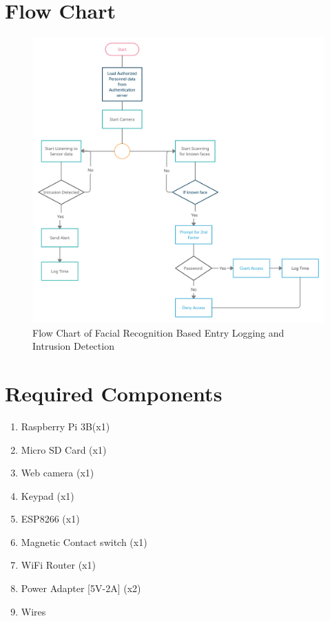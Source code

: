 \section{Flow Chart}
\begin{figure}[h!]
    \centering
    \includegraphics[width=14cm]{images/flowchart.png}
    \caption{Flow Chart of Facial Recognition Based Entry Logging and Intrusion Detection}
\end{figure}


\section{Required Components}
\begin{enumerate}
    \item Raspberry Pi 3B(x1)
    \item Micro SD Card (x1)
    \item Web camera (x1)
    \item Keypad (x1)
    \item ESP8266 (x1)
    \item Magnetic Contact switch (x1)
    \item WiFi Router (x1)
    \item Power Adapter [5V-2A] (x2)
    \item Wires
\end{enumerate}

